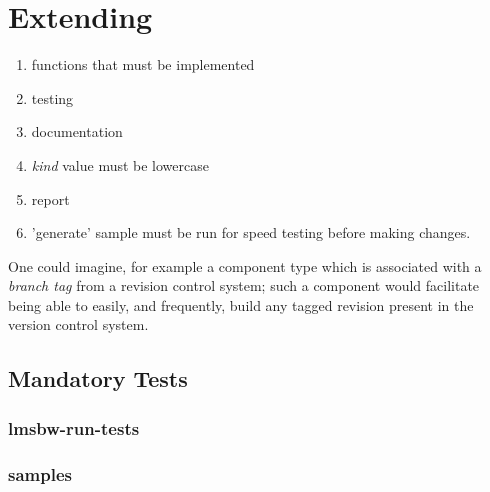 %
%
%
%
\chapter{Extending \lmsbw}\label{chap:extending}

\begin{enumerate}
\item functions that must be implemented
\item testing
\item documentation
\item \emph{kind} value must be lowercase
\item report
\item 'generate' sample must be run for speed testing before making
  changes.
\end{enumerate}

One could imagine, for example a component type which is associated
with a \emph{branch tag} from a revision control system; such a
component would facilitate being able to easily, and frequently, build
any tagged revision present in the version control system.

\section{Mandatory Tests}
\subsection{lmsbw-run-tests}
\subsection{samples}
